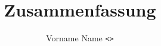 \documentclass[header, margin=big]{hsrzf}
\date{\thesemester}
\title{\textsl{\themodule} Zusammenfassung}
\author{Vorname Name \texttt{<\theauthoremail>}}
\begin{document}
\maketitle

\blinddocument
\end{document}

